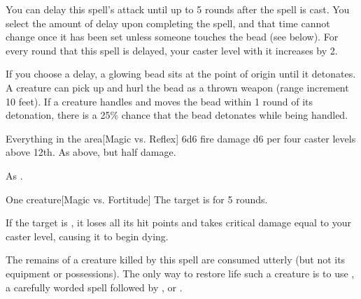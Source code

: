 \begin{spellheader}
\end{spellheader}
\begin{spelleffects}
    \spelleffect You can delay this spell's attack until up to 5 rounds after the spell is cast. You select the amount of delay upon completing the spell, and that time cannot change once it has been set unless someone touches the bead (see below). For every round that this spell is delayed, your caster level with it increases by 2.

    If you choose a delay, a glowing bead sits at the point of origin until it detonates. A creature can pick up and hurl the bead as a thrown weapon (range increment 10 feet). If a creature handles and moves the bead within 1 round of its detonation, there is a 25\% chance that the bead detonates while being handled.
    \begin{spelltargets}{Everything in the area}[Magic vs. Reflex]
        \spellsuccess 6d6 fire damage \add d6 per four caster levels above 12th.
        \spellfailure As above, but half damage.
    \end{spelltargets}

\end{spelleffects}
\begin{spellfooter}
    \spellnotes As .
\end{spellfooter}

\begin{spellheader}
    \spellrng{\rngclose}
\end{spellheader}
\begin{spelleffects}
    \begin{spelltarget}{One creature}[Magic vs. Fortitude]
        \spellsuccess The target is \staggered for 5 rounds.

        If the target is \bloodied, it loses all its hit points and takes critical damage equal to your caster level, causing it to begin dying.
    \end{spelltarget}
\end{spelleffects}
\begin{spellfooter}
    \spellnotes The remains of a creature killed by this spell are consumed utterly (but not its equipment or possessions). The only way to restore life such a creature is to use , a carefully worded  spell followed by , or .
\end{spellfooter}

